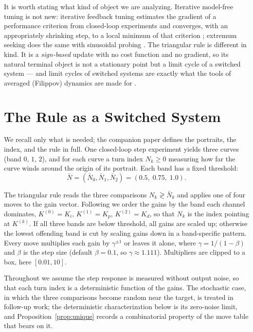 \documentclass[letterpaper, 10pt, conference, twocolumn]{ieeeconf}
\newcommand{\Nbar}{\bar{N}}
\begin{document}
It is worth stating what kind of object we are analyzing. Iterative model-free
tuning is not new: iterative feedback tuning estimates the gradient of a
performance criterion from closed-loop experiments and converges, with an
appropriately shrinking step, to a local minimum of that criterion
\cite{Hjalmarsson1998}; extremum seeking does the same with sinusoidal probing
\cite{Killingsworth2006}. The triangular rule is different in kind. It is a
\emph{sign-based} update with no cost function and no gradient, so its natural
terminal object is not a stationary point but a limit cycle of a switched
system --- and limit cycles of switched systems are exactly what the tools of
averaged (Filippov) dynamics are made for \cite{Filippov1988}.

\section{The Rule as a Switched System}
\label{sec:rule}

We recall only what is needed; the companion paper \cite{Paper1} defines the
portraits, the index, and the rule in full. One closed-loop step experiment
yields three curves (band $0$, $1$, $2$), and for each curve a turn index
$N_k \ge 0$ measuring how far the curve winds around the origin of its
portrait. Each band has a fixed threshold:
\begin{equation}
\Nbar = (\Nbar_0, \Nbar_1, \Nbar_2) = (0.5,\; 0.75,\; 1.0).
\label{eq:thresholds}
\end{equation}

The triangular rule reads the three comparisons $N_k \gtrless \Nbar_k$ and
applies one of four moves to the gain vector. Following \cite{Paper1} we
order the gains by the band each channel dominates,
$K^{(0)} = K_i$, $K^{(1)} = K_p$, $K^{(2)} = K_d$, so that $N_k$ is the index
pointing at $K^{(k)}$. If all
three bands are below threshold, all gains are scaled up; otherwise the lowest
offending band is cut by scaling gains down in a band-specific pattern. Every
move multiplies each gain by $\gamma^{\pm 1}$ or leaves it alone, where
$\gamma = 1/(1-\beta)$ and $\beta$ is the step size (default $\beta = 0.1$,
so $\gamma \approx 1.111$). Multipliers are clipped to a box, here
$[0.01, 10]$.

Throughout we assume the step response is measured without output noise, so
that each turn index is a deterministic function of the gains. The stochastic
case, in which the three comparisons become random near the target, is treated
in follow-up work; the deterministic characterization below is its zero-noise
limit, and Proposition~\ref{prop:unique} records a combinatorial property of
the move table that bears on it.
\end{document}
